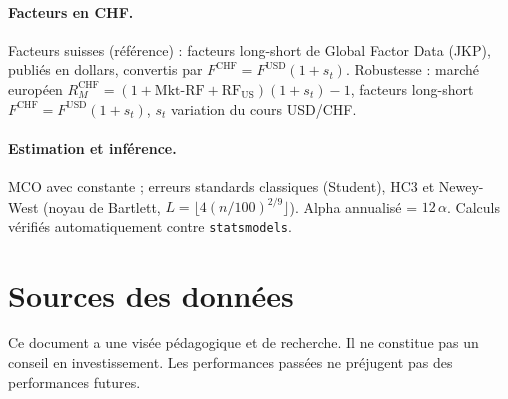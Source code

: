 \documentclass[11pt,a4paper]{article}
\begin{document}
\paragraph{Facteurs en CHF.} Facteurs suisses (référence) : facteurs long-short de Global Factor Data (JKP), publiés en dollars, convertis par $F^{\text{CHF}} = F^{\text{USD}}(1 + s_t)$. Robustesse : marché européen $R^{\text{CHF}}_M = (1 + \text{Mkt-RF} + \text{RF}_{\text{US}})(1 + s_t) - 1$, facteurs long-short $F^{\text{CHF}} = F^{\text{USD}}(1 + s_t)$, $s_t$ variation du cours USD/CHF.

\paragraph{Estimation et inférence.} MCO avec constante ; erreurs standards classiques (Student), HC3 et Newey-West (noyau de Bartlett, $L = \lfloor 4 (n/100)^{2/9} \rfloor$). Alpha annualisé = $12\,\alpha$. Calculs vérifiés automatiquement contre \texttt{statsmodels}.

\section{Sources des données}

\begin{center}\small

\end{center}

\vfill
{\small\color{gris} Ce document a une visée pédagogique et de recherche. Il ne constitue pas un conseil en investissement. Les performances passées ne préjugent pas des performances futures.}
\end{document}
